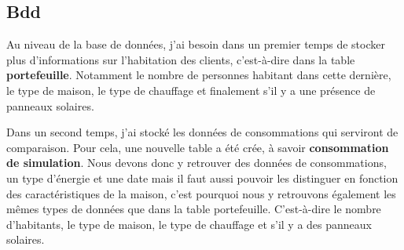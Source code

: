 \subsection{Bdd}

\begin{flushleft}
Au niveau de la base de données, j'ai besoin dans un premier temps de stocker plus d'informations sur l'habitation des clients, c'est-à-dire dans la table \textbf{portefeuille}. Notamment le nombre de personnes habitant dans cette dernière, le type de maison, le type de chauffage et finalement s'il y a une présence de panneaux solaires.
\end{flushleft}

\begin{flushleft}
Dans un second temps, j'ai stocké les données de consommations qui serviront de comparaison. Pour cela, une nouvelle table a été crée, à savoir \textbf{consommation de simulation}. Nous devons donc y retrouver des données de consommations, un type d'énergie et une date mais il faut aussi pouvoir les distinguer en fonction des caractéristiques de la maison, c'est pourquoi nous y retrouvons également les mêmes types de données que dans la table portefeuille. C'est-à-dire le nombre d'habitants, le type de maison, le type de chauffage et s'il y a des panneaux solaires.
\end{flushleft}


